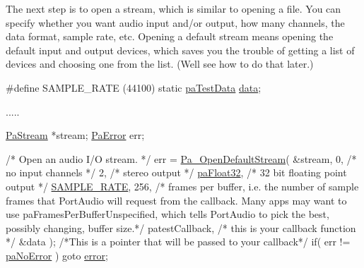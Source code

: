 The next step is to open a stream, which is similar to opening a file. You can specify whether you want audio input and/or output, how many channels, the data format, sample rate, etc. Opening a \textquotesingle{}\textquotesingle{}default\textquotesingle{}\textquotesingle{} stream means opening the default input and output devices, which saves you the trouble of getting a list of devices and choosing one from the list. (We\textquotesingle{}ll see how to do that later.) 
\begin{DoxyCode}
\textcolor{preprocessor}{#define SAMPLE\_RATE (44100)}
\textcolor{keyword}{static} \hyperlink{structpa_test_data}{paTestData} \hyperlink{lib_2expat_8h_ac39e72a1de1cb50dbdc54b08d0432a24}{data};

.....

    \hyperlink{portaudio_8h_a19874734f89958fccf86785490d53b4c}{PaStream} *stream;
    \hyperlink{portaudio_8h_a4949e4a8ef9f9dbe8cbee414ce69841d}{PaError} err;

    \textcolor{comment}{/* Open an audio I/O stream. */}
    err = \hyperlink{portaudio_8h_a0a12735ac191200f696a43b87667b714}{Pa\_OpenDefaultStream}( &stream,
                                0,          \textcolor{comment}{/* no input channels */}
                                2,          \textcolor{comment}{/* stereo output */}
                                \hyperlink{portaudio_8h_a2f16d29916725b8791eae60ab9e0b081}{paFloat32},  \textcolor{comment}{/* 32 bit floating point output */}
                                \hyperlink{sine_8cxx_a254783139625fe796c8924e0b04b1aee}{SAMPLE\_RATE},
                                256,        \textcolor{comment}{/* frames per buffer, i.e. the number}
\textcolor{comment}{                                                   of sample frames that PortAudio will}
\textcolor{comment}{                                                   request from the callback. Many apps}
\textcolor{comment}{                                                   may want to use}
\textcolor{comment}{                                                   paFramesPerBufferUnspecified, which}
\textcolor{comment}{                                                   tells PortAudio to pick the best,}
\textcolor{comment}{                                                   possibly changing, buffer size.*/}
                                patestCallback, \textcolor{comment}{/* this is your callback function */}
                                &data ); \textcolor{comment}{/*This is a pointer that will be passed to}
\textcolor{comment}{                                                   your callback*/}
    \textcolor{keywordflow}{if}( err != \hyperlink{portaudio_8h_a2e45bf8b5145f131a91c128af2bdaec7aeb09d15a48b6c1034728a9c518cfe4ba}{paNoError} ) \textcolor{keywordflow}{goto} \hyperlink{sndfile__load_8m_a3a81ee160b23b01b04b7c08b35123218}{error};
\end{DoxyCode}


